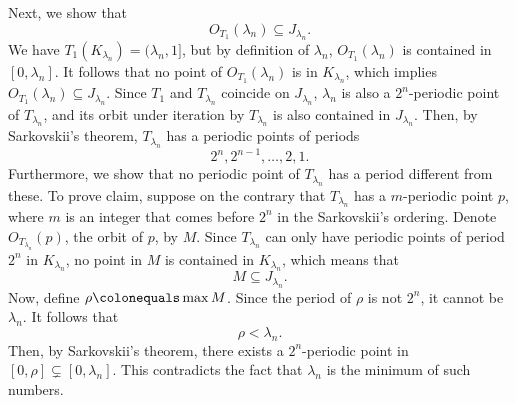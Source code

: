 \documentclass[12pt,twoside,draft]{book}
\begin{document}
\begin{example}
  Next, we show that 
  \begin{equation*}
    O_{T_1}(\lambda_n) \subseteq J_{\lambda_n}.
  \end{equation*}
We have $T_1(K_{\lambda_n}) = (\lambda_n, 1]$, but by definition of $\lambda_n$, $O_{T_1}(\lambda_n)$ is contained in $[0,\lambda_n]$.
It follows that no point of $O_{T_1}(\lambda_n)$ is in $K_{\lambda_n}$, which implies $O_{T_1}(\lambda_n) \subseteq J_{\lambda_n}$.
Since $T_1$ and $T_{\lambda_n}$ coincide on $J_{\lambda_n}$, $\lambda_n$ is also a $2^n$-periodic point of $T_{\lambda_n}$, and its orbit under iteration by $T_{\lambda_n}$ is also contained in $J_{\lambda_n}$.
Then, by Sarkovskii's theorem, $T_{\lambda_n}$ has a periodic points of periods
\begin{equation*}
  2^n, 2^{n-1}, \ldots, 2, 1.
\end{equation*}
Furthermore, we show that no periodic point of $T_{\lambda_n}$ has a period different from these.
To prove claim, suppose on the contrary that $T_{\lambda_n}$ has a $m$-periodic point $p$, where $m$ is an integer that comes before $2^n$ in the Sarkovskii's ordering.
Denote $O_{T_{\lambda_n}}(p)$, the orbit of $p$, by $M$.
Since $T_{\lambda_n}$ can only have periodic points of period $2^n$ in $K_{\lambda_n}$, no point in $M$ is contained in $K_{\lambda_n}$, which means that
\begin{equation*}
  M \subseteq J_{\lambda_n}.
\end{equation*}
Now, define $\rho \ceq \max M$.
Since the period of $\rho$ is not $2^n$, it cannot be $\lambda_n$.
It follows that
\begin{equation*}
  \rho < \lambda_n.
\end{equation*}
Then, by Sarkovskii's theorem, there exists a $2^n$-periodic point in $[0,\rho] \subsetneq [0, \lambda_n]$.
This contradicts the fact that $\lambda_n$ is the minimum of such numbers.


\end{example}
\end{document}

